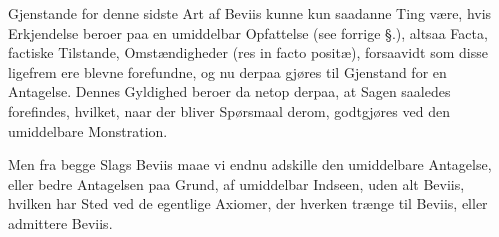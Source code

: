 \documentclass[12pt]{book}
\def\textit#1{#1}%
\newcommand{\opage}[1]{\marginnote{\footnotesize\textit{[#1]}}}
\begin{document}
Gjenstande for denne sidste Art af Beviis kunne kun saadanne Ting være, hvis
Erkjendelse beroer paa en umiddelbar Opfattelse (see forrige §.), altsaa Facta,
factiske Tilstande, Omstændigheder (\textit{res in facto positæ}), forsaavidt som disse
ligefrem ere blevne forefundne, og nu derpaa gjøres til Gjenstand for en Antagelse.
Dennes Gyldighed beroer da netop derpaa, at Sagen saaledes forefindes, hvilket, naar der
bliver
\opage{321} Spørsmaal derom, godtgjøres ved den umiddelbare Monstration.

Men fra begge Slags Beviis maae vi endnu adskille den umiddelbare Antagelse, eller
bedre Antagelsen paa Grund, af umiddelbar Indseen, uden alt Beviis, hvilken har Sted
ved de egentlige Axiomer, der hverken trænge til Beviis, eller admittere Beviis.
\end{document}
